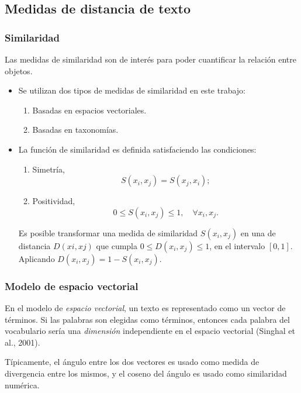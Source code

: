 \subsection{Medidas de distancia de texto}
\begin{frame}
	\frametitle{Similaridad}
	Las medidas de similaridad son de interés para poder cuantificar la relación entre objetos.
	\bigskip
	\begin{itemize}
		\item Se utilizan dos tipos de medidas de similaridad en este trabajo:
		\begin{enumerate}[<*>]
			\item Basadas en espacios vectoriales.
			\item Basadas en taxonomías.
		\end{enumerate}

		\bigskip
		\item
		La función de similaridad es definida satisfaciendo las condiciones:
		\begin{enumerate}[<*>]
			\item Simetría,
			\[S(x_i,x_j)=S(x_j,x_i);\]

			\item Positividad,
			\[0 \leq S(x_i,x_j) \leq 1, \quad \forall x_i,x_j.\]
		\end{enumerate}
		\medskip
		Es posible transformar una medida de similaridad \(S(x_i,x_j)\) en una de distancia \(D(xi,xj)\) que cumpla \(0 \leq D(x_i,x_j) \leq 1\), en el intervalo \([0,1]\). Aplicando \(D(x_i,x_j) = 1 - S(x_i,x_j)\).
	\end{itemize}
\end{frame}

\begin{frame}
	\frametitle{Modelo de espacio vectorial}
	En el modelo de \textit{espacio vectorial}, un texto es representado como un vector de términos. Si las palabras son elegidas como términos, entonces cada palabra del vocabulario sería una \textit{dimensión} independiente en el espacio vectorial (Singhal et al., 2001).

	\bigskip

	Típicamente, el ángulo entre los dos vectores es usado como medida de divergencia entre los mismos, y el coseno del ángulo es usado como similaridad numérica.
\end{frame}

